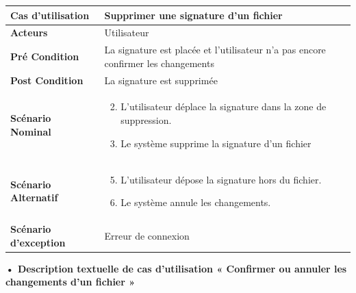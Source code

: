 \begin{longtable}{|p{5cm}|p{10cm}|}
\hline
\textbf{Cas d'utilisation}&Supprimer une signature d'un fichier \\
\hline
\textbf{Acteurs}&Utilisateur\\
\hline
\textbf{Pré Condition}&La signature est placée et l'utilisateur n'a pas encore confirmer les changements\\
\hline
\textbf{Post Condition}&La signature est supprimée\\
\hline
\textbf{Scénario Nominal}&
\vspace{-\baselineskip}
\begin{enumerate}
    \setcounter{enumi}{1}
    \item L'utilisateur déplace la signature dans la zone de suppression.
    \item Le système supprime la signature d'un fichier
\end{enumerate}\\
\hline
\textbf{Scénario Alternatif}&
\vspace{-\baselineskip}
\begin{enumerate}
    \setcounter{enumi}{4}
    \item L'utilisateur dépose la signature hors du fichier.
    \item Le système annule les changements.
\end{enumerate}\\
\hline
\textbf{Scénario d'exception}&Erreur de connexion\\
\hline
\end{longtable}


\textbf{•	Description textuelle de cas d'utilisation « Confirmer ou annuler les changements d'un fichier »}

